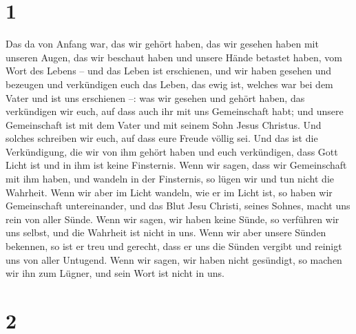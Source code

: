 \hypertarget{section}{%
\section{1}\label{section}}

 Das da von Anfang war, das wir gehört haben, das wir
gesehen haben mit unseren Augen, das wir beschaut haben und unsere Hände
betastet haben, vom Wort des Lebens --  und das Leben ist
erschienen, und wir haben gesehen und bezeugen und verkündigen euch das
Leben, das ewig ist, welches war bei dem Vater und ist uns erschienen
--:  was wir gesehen und gehört haben, das verkündigen wir
euch, auf dass auch ihr mit uns Gemeinschaft habt; und unsere
Gemeinschaft ist mit dem Vater und mit seinem Sohn Jesus Christus.
 Und solches schreiben wir euch, auf dass eure Freude
völlig sei.  Und das ist die Verkündigung, die wir von ihm
gehört haben und euch verkündigen, dass Gott Licht ist und in ihm ist
keine Finsternis.  Wenn wir sagen, dass wir Gemeinschaft
mit ihm haben, und wandeln in der Finsternis, so lügen wir und tun nicht
die Wahrheit.  Wenn wir aber im Licht wandeln, wie er im
Licht ist, so haben wir Gemeinschaft untereinander, und das Blut Jesu
Christi, seines Sohnes, macht uns rein von aller Sünde. 
Wenn wir sagen, wir haben keine Sünde, so verführen wir uns selbst, und
die Wahrheit ist nicht in uns.  Wenn wir aber unsere
Sünden bekennen, so ist er treu und gerecht, dass er uns die Sünden
vergibt und reinigt uns von aller Untugend.  Wenn wir
sagen, wir haben nicht gesündigt, so machen wir ihn zum Lügner, und sein
Wort ist nicht in uns.

\hypertarget{section-1}{%
\section{2}\label{section-1}}

